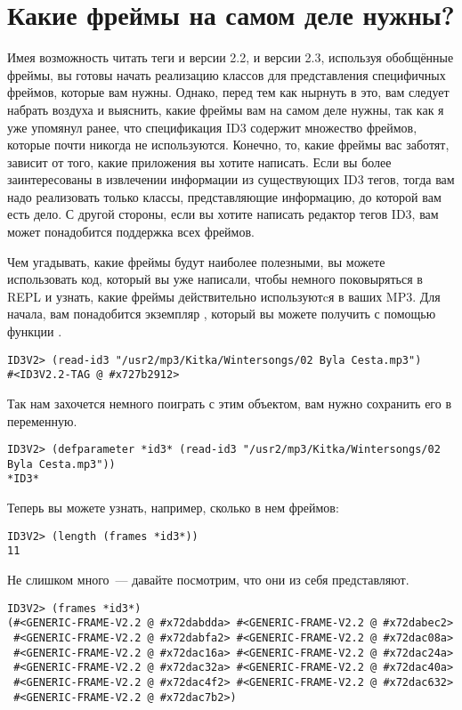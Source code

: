 \section{Какие фреймы на самом деле нужны?}

Имея возможность читать теги и версии 2.2, и версии 2.3, используя обобщённые фреймы, вы
готовы начать реализацию классов для представления специфичных фреймов, которые вам
нужны. Однако, перед тем как нырнуть в это, вам следует набрать воздуха и выяснить, какие
фреймы вам на самом деле нужны, так как я уже упомянул ранее, что спецификация ID3
содержит множество фреймов, которые почти никогда не используются. Конечно, то, какие
фреймы вас заботят, зависит от того, какие приложения вы хотите написать. Если вы более
заинтересованы в извлечении информации из существующих ID3 тегов, тогда вам надо
реализовать только классы, представляющие информацию, до которой вам есть дело. С другой
стороны, если вы хотите написать редактор тегов ID3, вам может понадобится поддержка всех
фреймов.

Чем угадывать, какие фреймы будут наиболее полезными, вы можете использовать код, который
вы уже написали, чтобы немного поковыряться в REPL и узнать, какие фреймы действительно
используютcя в ваших MP3. Для начала, вам понадобится экземпляр , который вы
можете получить с помощью функции .

\begin{lstlisting}
ID3V2> (read-id3 "/usr2/mp3/Kitka/Wintersongs/02 Byla Cesta.mp3")
#<ID3V2.2-TAG @ #x727b2912>
\end{lstlisting}

Так нам захочется немного поиграть с этим объектом, вам нужно сохранить его в переменную.

\begin{lstlisting}
ID3V2> (defparameter *id3* (read-id3 "/usr2/mp3/Kitka/Wintersongs/02 Byla Cesta.mp3"))
*ID3*
\end{lstlisting}

Теперь вы можете узнать, например, сколько в нем фреймов:

\begin{lstlisting}
ID3V2> (length (frames *id3*))
11
\end{lstlisting}

Не слишком много~--- давайте посмотрим, что они из себя представляют.

\begin{lstlisting}
ID3V2> (frames *id3*)
(#<GENERIC-FRAME-V2.2 @ #x72dabdda> #<GENERIC-FRAME-V2.2 @ #x72dabec2>
 #<GENERIC-FRAME-V2.2 @ #x72dabfa2> #<GENERIC-FRAME-V2.2 @ #x72dac08a>
 #<GENERIC-FRAME-V2.2 @ #x72dac16a> #<GENERIC-FRAME-V2.2 @ #x72dac24a>
 #<GENERIC-FRAME-V2.2 @ #x72dac32a> #<GENERIC-FRAME-V2.2 @ #x72dac40a>
 #<GENERIC-FRAME-V2.2 @ #x72dac4f2> #<GENERIC-FRAME-V2.2 @ #x72dac632>
 #<GENERIC-FRAME-V2.2 @ #x72dac7b2>)
\end{lstlisting}

